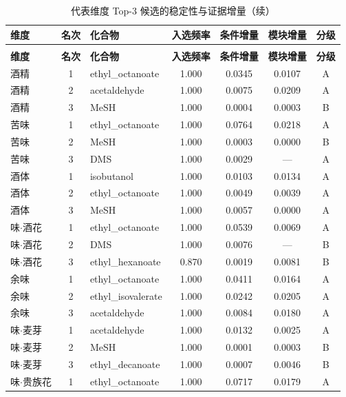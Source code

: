 \documentclass[zihao=-4,a4paper,UTF8,fontset=none]{ctexart}
\begin{document}
\begin{longtable}{@{}p{1.9cm}cp{4.2cm}cccc@{}}
\caption{代表维度 Top-3 候选的稳定性与证据增量}\\
\toprule
\textbf{维度} & \textbf{名次} & \textbf{化合物} & \textbf{入选频率} & \textbf{条件增量} & \textbf{模块增量} & \textbf{分级} \\ \midrule
\endfirsthead
\caption*{代表维度 Top-3 候选的稳定性与证据增量（续）}\\
\toprule
\textbf{维度} & \textbf{名次} & \textbf{化合物} & \textbf{入选频率} & \textbf{条件增量} & \textbf{模块增量} & \textbf{分级} \\ \midrule
\endhead
\bottomrule
\endlastfoot
酒精 & 1 & ethyl\_octanoate & 1.000 & 0.0345 & 0.0107 & A \\
酒精 & 2 & acetaldehyde & 1.000 & 0.0075 & 0.0209 & A \\
酒精 & 3 & MeSH & 1.000 & 0.0004 & 0.0003 & B \\
苦味 & 1 & ethyl\_octanoate & 1.000 & 0.0764 & 0.0218 & A \\
苦味 & 2 & MeSH & 1.000 & 0.0003 & 0.0000 & B \\
苦味 & 3 & DMS & 1.000 & 0.0029 & --- & A \\
酒体 & 1 & isobutanol & 1.000 & 0.0103 & 0.0134 & A \\
酒体 & 2 & ethyl\_octanoate & 1.000 & 0.0049 & 0.0039 & A \\
酒体 & 3 & MeSH & 1.000 & 0.0057 & 0.0000 & A \\
味$\cdot$酒花 & 1 & ethyl\_octanoate & 1.000 & 0.0539 & 0.0069 & A \\
味$\cdot$酒花 & 2 & DMS & 1.000 & 0.0076 & --- & B \\
味$\cdot$酒花 & 3 & ethyl\_hexanoate & 0.870 & 0.0019 & 0.0081 & B \\
余味 & 1 & ethyl\_octanoate & 1.000 & 0.0411 & 0.0164 & A \\
余味 & 2 & ethyl\_isovalerate & 1.000 & 0.0242 & 0.0205 & A \\
余味 & 3 & acetaldehyde & 1.000 & 0.0084 & 0.0180 & A \\
味$\cdot$麦芽 & 1 & acetaldehyde & 1.000 & 0.0132 & 0.0025 & A \\
味$\cdot$麦芽 & 2 & MeSH & 1.000 & 0.0001 & 0.0003 & B \\
味$\cdot$麦芽 & 3 & ethyl\_decanoate & 1.000 & 0.0007 & 0.0046 & B \\
味$\cdot$贵族花 & 1 & ethyl\_octanoate & 1.000 & 0.0717 & 0.0179 & A \\

\end{longtable}
\end{document}
